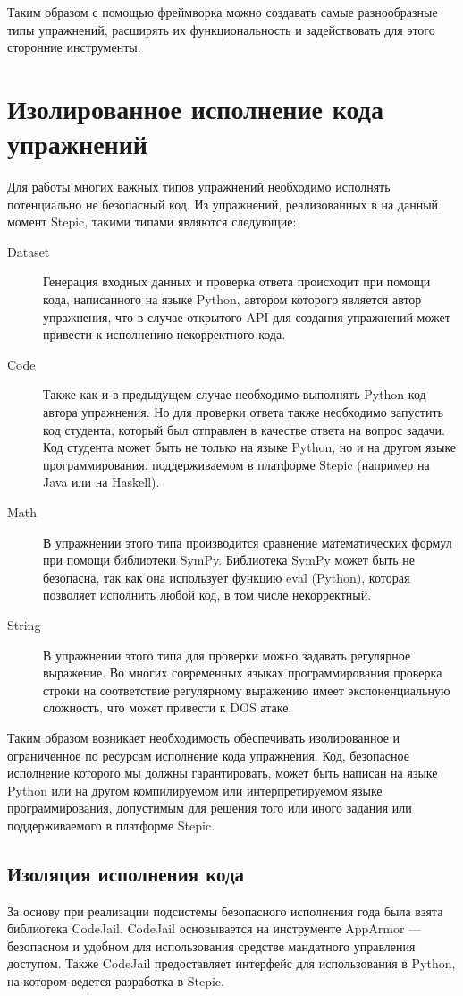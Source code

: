 \documentclass{matmex-diploma-custom}
\begin{document}
Таким образом с помощью фреймворка можно создавать самые разнообразные
типы упражнений, расширять их функциональность и задействовать для
этого сторонние инструменты.

\section{Изолированное исполнение кода упражнений}

Для работы многих важных типов упражнений необходимо исполнять
потенциально не безопасный код. Из упражнений, реализованных в на
данный момент Stepic, такими типами являются следующие:
\begin{description}
\item[Dataset] Генерация входных данных и проверка ответа происходит
  при помощи кода, написанного на языке Python, автором которого
  является автор упражнения, что в случае открытого API для создания
  упражнений может привести к исполнению некорректного кода.
\item[Code] Также как и в предыдущем случае необходимо выполнять
  Python-код автора упражнения. Но для проверки ответа также
  необходимо запустить код студента, который был отправлен в качестве
  ответа на вопрос задачи. Код студента может быть не только на языке
  Python, но и на другом языке программирования, поддерживаемом в
  платформе Stepic (например на Java или на Haskell).
\item[Math] В упражнении этого типа производится сравнение
  математических формул при помощи библиотеки SymPy. Библиотека SymPy
  может быть не безопасна, так как она использует функцию eval
  (Python), которая позволяет исполнить любой код, в том числе
  некорректный.
\item[String] В упражнении этого типа для проверки можно задавать
  регулярное выражение. Во многих современных языках программирования
  проверка строки на соответствие регулярному выражению имеет
  экспоненциальную сложность, что может привести к DOS атаке.
\end{description}

Таким образом возникает необходимость обеспечивать изолированное и
ограниченное по ресурсам исполнение кода упражнения. Код, безопасное
исполнение которого мы должны гарантировать, может быть написан на
языке Python или на другом компилируемом или интерпретируемом языке
программирования, допустимым для решения того или иного задания или
поддерживаемого в платформе Stepic.

\subsection{Изоляция исполнения кода}
За основу при реализации подсистемы безопасного исполнения года была
взята библиотека CodeJail. CodeJail основывается на инструменте
AppArmor --- безопасном \cite{Bauer} и удобном для использования
\cite{Schreuders} средстве мандатного управления доступом. Также
CodeJail предоставляет интерфейс для использования в Python, на
котором ведется разработка в Stepic.
\end{document}
